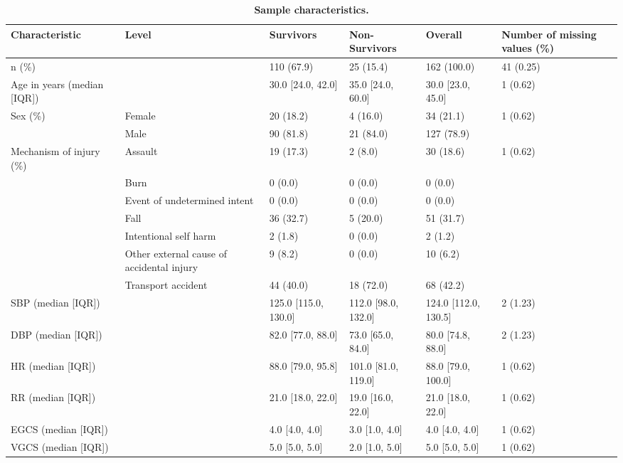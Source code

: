 \begin{table}[!ht]
\centering
\caption{\bf Sample characteristics.} 
\label{tab:sample-characteristics}
\begin{adjustbox}{max width = \linewidth} 
\begin{threeparttable} 
\begin{tabular} 
{llllll}
  \toprule
Characteristic & Level & Survivors & Non-Survivors & Overall & Number of missing values (\%) \\ 
  \midrule
n (\%) &  & 110 (67.9) & 25 (15.4) & 162 (100.0) & 41 (0.25) \\ 
  Age in years (median [IQR]) &  & 30.0 [24.0, 42.0] & 35.0 [24.0, 60.0] & 30.0 [23.0, 45.0] & 1 (0.62) \\ 
  Sex (\%) & Female & 20 (18.2) & 4 (16.0) & 34 (21.1) & 1 (0.62) \\ 
   & Male & 90 (81.8) & 21 (84.0) & 127 (78.9) &  \\ 
  Mechanism of injury (\%) & Assault & 19 (17.3) & 2 (8.0) & 30 (18.6) & 1 (0.62) \\ 
   & Burn & 0 (0.0) & 0 (0.0) & 0 (0.0) &  \\ 
   & Event of undetermined intent & 0 (0.0) & 0 (0.0) & 0 (0.0) &  \\ 
   & Fall & 36 (32.7) & 5 (20.0) & 51 (31.7) &  \\ 
   & Intentional self harm & 2 (1.8) & 0 (0.0) & 2 (1.2) &  \\ 
   & Other external cause of accidental injury & 9 (8.2) & 0 (0.0) & 10 (6.2) &  \\ 
   & Transport accident & 44 (40.0) & 18 (72.0) & 68 (42.2) &  \\ 
  SBP (median [IQR]) &  & 125.0 [115.0, 130.0] & 112.0 [98.0, 132.0] & 124.0 [112.0, 130.5] & 2 (1.23) \\ 
  DBP (median [IQR]) &  & 82.0 [77.0, 88.0] & 73.0 [65.0, 84.0] & 80.0 [74.8, 88.0] & 2 (1.23) \\ 
  HR (median [IQR]) &  & 88.0 [79.0, 95.8] & 101.0 [81.0, 119.0] & 88.0 [79.0, 100.0] & 1 (0.62) \\ 
  RR (median [IQR]) &  & 21.0 [18.0, 22.0] & 19.0 [16.0, 22.0] & 21.0 [18.0, 22.0] & 1 (0.62) \\ 
  EGCS (median [IQR]) &  & 4.0 [4.0, 4.0] & 3.0 [1.0, 4.0] & 4.0 [4.0, 4.0] & 1 (0.62) \\ 
  VGCS (median [IQR]) &  & 5.0 [5.0, 5.0] & 2.0 [1.0, 5.0] & 5.0 [5.0, 5.0] & 1 (0.62) \\ 

\end{tabular}
\end{threeparttable}
\end{adjustbox}
\end{table}
